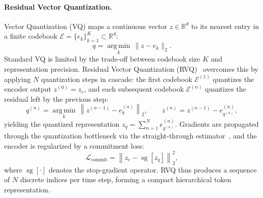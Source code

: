 \documentclass{article}
\begin{document}
\paragraph{Residual Vector Quantization.}
Vector Quantization (VQ) maps a continuous vector $z \in \mathbb{R}^d$ to its nearest entry in a finite codebook $\mathcal{E} = \{e_k\}_{k=1}^{K} \subset \mathbb{R}^d$:
\begin{equation}
  q = \operatorname*{arg\,min}_{k}\,\|z - e_k\|_2.
\end{equation}
Standard VQ is limited by the trade-off between codebook size $K$ and representation precision.
Residual Vector Quantization (RVQ)~\citep{défossez2022highfidelityneuralaudio, 9879532} overcomes this by applying $N$ quantization steps in cascade: the first codebook $\mathcal{E}^{(1)}$ quantizes the encoder output $z^{(0)} = z_e$, and each subsequent codebook $\mathcal{E}^{(n)}$ quantizes the residual left by the previous step:
\begin{equation}
  q^{(n)} = \operatorname*{arg\,min}_{k}\,\left\|z^{(n-1)} - e^{(n)}_k\right\|_2, \qquad
  z^{(n)} = z^{(n-1)} - e^{(n)}_{q^{(n)}},
\end{equation}
yielding the quantized representation $z_q = \sum_{n=1}^{N} e^{(n)}_{q^{(n)}}$.
Gradients are propagated through the quantization bottleneck via the straight-through estimator~\citep{défossez2022highfidelityneuralaudio}, and the encoder is regularized by a commitment loss:
\begin{equation}
  \mathcal{L}_{\mathrm{commit}} = \left\|z_e - \operatorname{sg}[z_q]\right\|_2^2,
  \label{eq:commit}
\end{equation}
where $\operatorname{sg}[\cdot]$ denotes the stop-gradient operator.
RVQ thus produces a sequence of $N$ discrete indices per time step, forming a compact hierarchical token representation.
\end{document}

